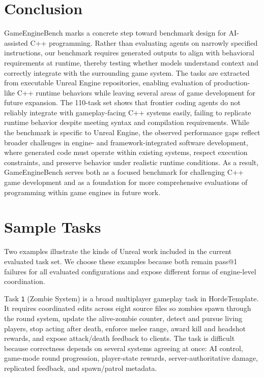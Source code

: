 \documentclass[11pt]{article}
\newcommand{\benchmarkname}{GameEngineBench\xspace}
\begin{document}
\section{Conclusion}
\benchmarkname marks a concrete step toward benchmark design for AI-assisted C++ programming. Rather than evaluating agents on narrowly specified instructions, our benchmark requires generated outputs to align with behavioral requirements at runtime, thereby testing whether models understand context and correctly integrate with the surrounding game system. The tasks are extracted from executable Unreal Engine repositories, enabling evaluation of production-like C++ runtime behaviors while leaving several areas of game development for future expansion. The 110-task set shows that frontier coding agents do not reliably integrate with gameplay-facing C++ systems easily, failing to replicate runtime behavior despite meeting syntax and compilation requirements. While the benchmark is specific to Unreal Engine, the observed performance gaps reflect broader challenges in engine- and framework-integrated software development, where generated code must operate within existing systems, respect execution constraints, and preserve behavior under realistic runtime conditions. As a result, \benchmarkname{} serves both as a focused benchmark for challenging C++ game development and as a foundation for more comprehensive evaluations of programming within game engines in future work.




\appendix
\section{Sample Tasks}
\label{app:sample-tasks}
Two examples illustrate the kinds of Unreal work included in the current evaluated task set. We choose these examples because both remain pass@1 failures for all evaluated configurations and expose different forms of engine-level coordination.

Task \texttt{1} (Zombie System) is a broad multiplayer gameplay task in HordeTemplate. It requires coordinated edits across eight source files so zombies spawn through the round system, update the alive-zombie counter, detect and pursue living players, stop acting after death, enforce melee range, award kill and headshot rewards, and expose attack/death feedback to clients. The task is difficult because correctness depends on several systems agreeing at once: AI control, game-mode round progression, player-state rewards, server-authoritative damage, replicated feedback, and spawn/patrol metadata.
\end{document}
